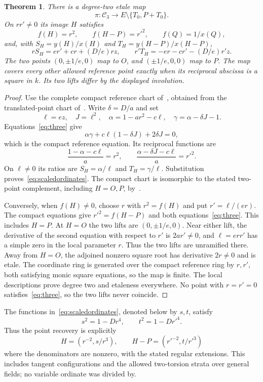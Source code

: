 \documentclass[11pt,a4paper]{article}
\newtheorem{theorem}{Theorem}[section]
\begin{document}
\begin{theorem}\label{thm:cover}
There is a degree-two etale map
\[
 \pi:\mathcal C_3\longrightarrow E\setminus\{T_0,P+T_0\}.
\]
On $rr'\ne0$ its image $H$ satisfies
\[
 f(H)=r^2,\qquad f(H-P)=r'^2,
 \qquad f(Q)=1/x(Q),
\]
and, with $S_H=y(H)/x(H)$ and $T_H=y(H-P)/x(H-P)$,
\begin{equation}\label{eq:scaledordinates}
 rS_H=e r'+cr+(D/e)rz,\qquad
 r'T_H=-er-cr'-(D/e)r'z.
\end{equation}
The two points $(0,\pm1/e,0)$ map to $O$, and
$(\pm1/e,0,0)$ map to $P$. The map covers every other allowed
reference point exactly when its reciprocal abscissa is a square
in $k$. Its two lifts differ by the displayed involution.
\end{theorem}
\begin{proof}
Use the complete compact reference chart of~\cite{Compact}, obtained
from the translated-point chart of~\cite{Three}. Write
$\delta=D/a$ and set
\[
 \ell=ez,\quad J=\ell^2,\quad
 \alpha=1-ar^2-c\ell,\quad \gamma=\alpha-\delta J-1.
\]
Equations~\eqref{eq:three} give
\[
 \alpha\gamma+c\ell(1-\delta J)+2\delta J=0,
\]
which is the compact reference equation. Its reciprocal functions are
\[
 \frac{1-\alpha-c\ell}{a}=r^2,\qquad
 \frac{\alpha-\delta J-c\ell}{a}=r'^2.
\]
On $\ell\ne0$ its ratios are $S_H=\alpha/\ell$ and
$T_H=\gamma/\ell$. Substitution proves~\eqref{eq:scaledordinates}.
The compact chart is isomorphic to the stated two-point complement,
including $H=O,P$, by~\cite[Theorem 1.1]{Compact}.

Conversely, when $f(H)\ne0$, choose $r$ with $r^2=f(H)$ and put
$r'=\ell/(er)$. The compact equations give $r'^2=f(H-P)$ and
both equations~\eqref{eq:three}. This includes $H=P$. At $H=O$
the two lifts are $(0,\pm1/e,0)$. Near either lift, the derivative
of the second equation with respect to $r'$ is $2ar'\ne0$,
and $\ell=err'$ has a simple zero in the local parameter $r$.
Thus the two lifts are unramified there. Away from $H=O$, the
adjoined nonzero square root has derivative $2r\ne0$ and is etale.
The coordinate ring is generated over the compact reference ring by
$r,r'$, both satisfying monic square equations, so the map is finite.
The local descriptions prove degree two and etaleness everywhere.
No point with $r=r'=0$ satisfies~\eqref{eq:three}, so the two
lifts never coincide.
\end{proof}

The functions in~\eqref{eq:scaledordinates}, denoted below by $s,t$,
satisfy
\begin{equation}\label{eq:quarticordinates}
                 s^2=1-Dr^4,\qquad t^2=1-Dr'^4.
\end{equation}
Thus the point recovery is explicitly
\[
 H=(r^{-2},s/r^3),\qquad H-P=(r'^{-2},t/r'^3)
\]
where the denominators are nonzero, with the stated regular extensions.
This includes tangent configurations and the allowed two-torsion
strata over general fields; no variable ordinate was divided by.
\end{document}
